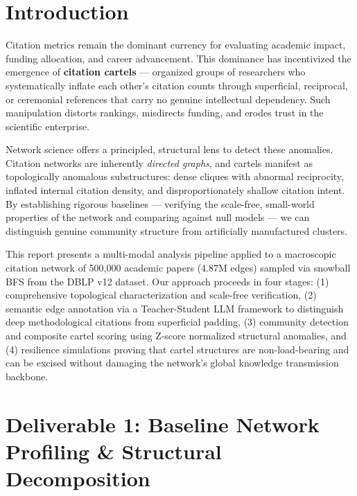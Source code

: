 
\section{Introduction}
Citation metrics remain the dominant currency for evaluating academic impact, funding allocation, and career advancement. This dominance has incentivized the emergence of \textbf{citation cartels} --- organized groups of researchers who systematically inflate each other's citation counts through superficial, reciprocal, or ceremonial references that carry no genuine intellectual dependency. Such manipulation distorts rankings, misdirects funding, and erodes trust in the scientific enterprise.

Network science offers a principled, structural lens to detect these anomalies. Citation networks are inherently \textit{directed graphs}, and cartels manifest as topologically anomalous substructures: dense cliques with abnormal reciprocity, inflated internal citation density, and disproportionately shallow citation intent. By establishing rigorous baselines --- verifying the scale-free, small-world properties of the network and comparing against null models --- we can distinguish genuine community structure from artificially manufactured clusters.

This report presents a multi-modal analysis pipeline applied to a macroscopic citation network of 500,000 academic papers (4.87M edges) sampled via snowball BFS from the DBLP v12 dataset. Our approach proceeds in four stages: (1) comprehensive topological characterization and scale-free verification, (2) semantic edge annotation via a Teacher-Student LLM framework to distinguish deep methodological citations from superficial padding, (3) community detection and composite cartel scoring using Z-score normalized structural anomalies, and (4) resilience simulations proving that cartel structures are non-load-bearing and can be excised without damaging the network's global knowledge transmission backbone.


\section{Deliverable 1: Baseline Network Profiling \& Structural Decomposition}

